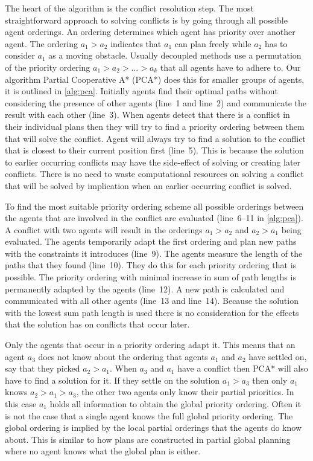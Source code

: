 The heart of the algorithm is the conflict resolution step. The most
straightforward approach to solving conflicts is by going through all possible
agent orderings. An ordering determines which agent has priority over another
agent. The ordering $a_1 > a_2$ indicates that $a_1$ can plan freely while
$a_2$ has to consider $a_1$ as a moving obstacle. Usually decoupled methods use
a permutation of the priority ordering $a_1 > a_2 > \ldots > a_k$ that all
agents have to adhere to. Our algorithm Partial Cooperative A* (PCA*) does this 
for smaller groups of agents, it is outlined in \autoref{alg:pca}. Initially 
agents find their optimal paths without considering the presence of other 
agents (line~1 and line~2) and communicate the result with each other (line~3).
When agents detect that there is a conflict in their individual plans then they 
will try to find a priority ordering between them that will solve the conflict. 
Agent will always try to find a solution to the conflict that is closest to 
their current position first (line~5). This is because the solution to earlier 
occurring conflicts may have the side-effect of solving or creating later 
conflicts. There is no need to waste computational resources on solving a 
conflict that will be solved by implication when an earlier occurring conflict 
is solved.

To find the most suitable priority ordering scheme all possible orderings
between the agents that are involved in the conflict are evaluated (line~6--11 
in \autoref{alg:pca}). A conflict with two agents will result in the orderings 
$a_1 > a_2$ and $a_2 > a_1$ being evaluated. The agents temporarily adapt the 
first ordering and plan new paths with the constraints it introduces (line~9). 
The agents measure the length of the paths that they found (line~10). They do 
this for each priority ordering that is possible. The priority ordering with 
minimal increase in sum of path lengths is permanently adapted by the 
agents (line~12). A new path is calculated and communicated with all other 
agents (line~13 and line~14). Because the solution with the lowest sum path 
length is used there is no consideration for the effects that the solution has 
on conflicts that occur later.

Only the agents that occur in a priority ordering adapt it. This means that an
agent $a_3$ does not know about the ordering that agents $a_1$ and $a_2$ have
settled on, say that they picked $a_2 > a_1$. When $a_3$ and $a_1$ have a
conflict then PCA* will also have to find a solution for it. If they settle on 
the
solution $a_1 > a_3$ then only $a_1$ knows $a_2 > a_1 > a_3$, the other two
agents only know their partial priorities. In this case $a_1$ holds all 
information to obtain the global priority ordering. Often it is not the 
case that a single agent knows the
full global priority ordering. The global ordering is implied by the local 
partial orderings that the agents do know about. This is similar to how plans 
are constructed in partial global planning where no agent knows what the global 
plan is either.

